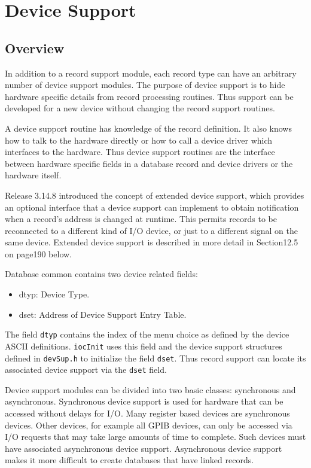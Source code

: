 \chapter{Device Support}

\section{Overview}

In addition to a record support module, each record type can have an arbitrary number of device support modules. The 
purpose of device support is to hide hardware specific details from record processing routines. Thus support can be 
developed for a new device without changing the record support routines.

A device support routine has knowledge of the record definition. It also knows how to talk to the hardware directly or how 
to call a device driver which interfaces to the hardware. Thus device support routines are the interface between hardware 
specific fields in a database record and device drivers or the hardware itself.

Release 3.14.8 introduced the concept of extended device support, which provides an optional interface that a device 
support can implement to obtain notification when a record's address is changed at runtime. This permits records to be 
reconnected to a different kind of I/O device, or just to a different signal on the same device. Extended device support is 
described in more detail in Section12.5 on page190 below.

Database common contains two device related fields:

\begin{itemize}\item {}dtyp:  Device Type.

\item {}dset:  Address of Device Support Entry Table.

\end{itemize}The field \verb|dtyp| contains the index of the menu choice as defined by the device ASCII definitions. \verb|iocInit| uses this 
field and the device support structures defined in \verb|devSup.h| to initialize the field \verb|dset|. Thus record support can locate 
its associated device support via the \verb|dset| field.

Device support modules can be divided into two basic classes: synchronous and asynchronous. Synchronous device 
support is used for hardware that can be accessed without delays for I/O. Many register based devices are synchronous 
devices. Other devices, for example all GPIB devices, can only be accessed via I/O requests that may take large amounts 
of time to complete. Such devices must have associated asynchronous device support. Asynchronous device support 
makes it more difficult to create databases that have linked records.

